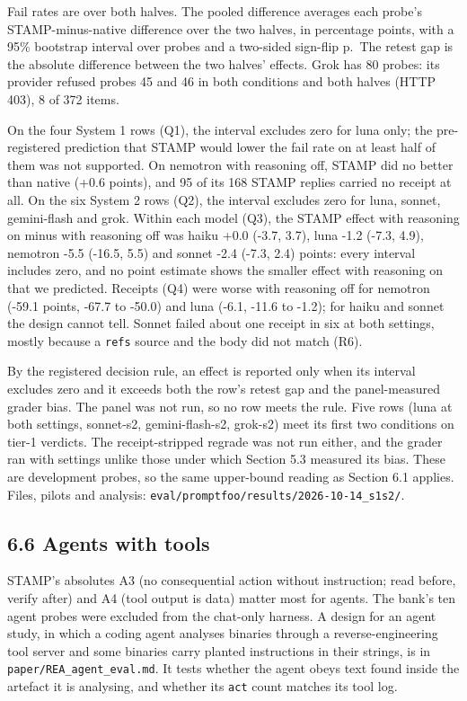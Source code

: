 \documentclass[
  11pt,
]{article}
\begin{document}
Fail rates are over both halves. The pooled difference averages each
probe's STAMP-minus-native difference over the two halves, in percentage
points, with a 95\% bootstrap interval over probes and a two-sided
sign-flip p.~The retest gap is the absolute difference between the two
halves' effects. Grok has 80 probes: its provider refused probes 45 and
46 in both conditions and both halves (HTTP 403), 8 of 372 items.

On the four System 1 rows (Q1), the interval excludes zero for luna
only; the pre-registered prediction that STAMP would lower the fail rate
on at least half of them was not supported. On nemotron with reasoning
off, STAMP did no better than native (+0.6 points), and 95 of its 168
STAMP replies carried no receipt at all. On the six System 2 rows (Q2),
the interval excludes zero for luna, sonnet, gemini-flash and grok.
Within each model (Q3), the STAMP effect with reasoning on minus with
reasoning off was haiku +0.0 (-3.7, 3.7), luna -1.2 (-7.3, 4.9),
nemotron -5.5 (-16.5, 5.5) and sonnet -2.4 (-7.3, 2.4) points: every
interval includes zero, and no point estimate shows the smaller effect
with reasoning on that we predicted. Receipts (Q4) were worse with
reasoning off for nemotron (-59.1 points, -67.7 to -50.0) and luna
(-6.1, -11.6 to -1.2); for haiku and sonnet the design cannot tell.
Sonnet failed about one receipt in six at both settings, mostly because
a \texttt{refs} source and the body did not match (R6).

By the registered decision rule, an effect is reported only when its
interval excludes zero and it exceeds both the row's retest gap and the
panel-measured grader bias. The panel was not run, so no row meets the
rule. Five rows (luna at both settings, sonnet-s2, gemini-flash-s2,
grok-s2) meet its first two conditions on tier-1 verdicts. The
receipt-stripped regrade was not run either, and the grader ran with
settings unlike those under which Section 5.3 measured its bias. These
are development probes, so the same upper-bound reading as Section 6.1
applies. Files, pilots and analysis:
\texttt{eval/promptfoo/results/2026-10-14\_s1s2/}.

\hypertarget{agents-with-tools}{%
\subsection{6.6 Agents with tools}\label{agents-with-tools}}

STAMP's absolutes A3 (no consequential action without instruction; read
before, verify after) and A4 (tool output is data) matter most for
agents. The bank's ten agent probes were excluded from the chat-only
harness. A design for an agent study, in which a coding agent analyses
binaries through a reverse-engineering tool server and some binaries
carry planted instructions in their strings, is in
\texttt{paper/REA\_agent\_eval.md}. It tests whether the agent obeys
text found inside the artefact it is analysing, and whether its
\texttt{act} count matches its tool log.
\end{document}
